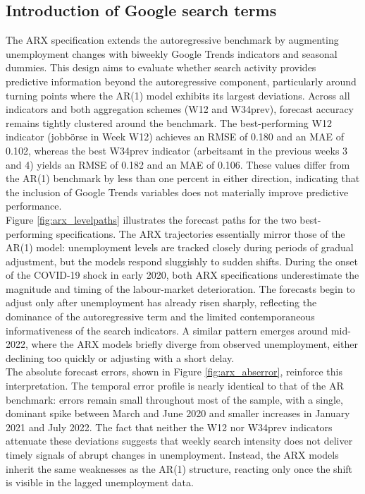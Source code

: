 \documentclass[12pt,a4paper]{article}
\begin{document}
\subsection{Introduction of Google search terms}
The ARX specification extends the autoregressive benchmark by augmenting unemployment changes with biweekly Google Trends indicators and seasonal dummies. This design aims to evaluate whether search activity provides predictive information beyond the autoregressive component, particularly around turning points where the AR(1) model exhibits its largest deviations.
Across all indicators and both aggregation schemes (W12 and W34prev), forecast accuracy remains tightly clustered around the benchmark. The best-performing W12 indicator (jobbörse in Week W12) achieves an RMSE of 0.180 and an MAE of 0.102, whereas the best W34prev indicator (arbeitsamt in the previous weeks 3 and 4) yields an RMSE of 0.182 and an MAE of 0.106. These values differ from the AR(1) benchmark by less than one percent in either direction, indicating that the inclusion of Google Trends variables does not materially improve predictive performance.\\
Figure \ref{fig:arx_levelpaths} illustrates the forecast paths for the two best-performing specifications. The ARX trajectories essentially mirror those of the AR(1) model: unemployment levels are tracked closely during periods of gradual adjustment, but the models respond sluggishly to sudden shifts.
During the onset of the COVID-19 shock in early 2020, both ARX specifications underestimate the magnitude and timing of the labour-market deterioration. The forecasts begin to adjust only after unemployment has already risen sharply, reflecting the dominance of the autoregressive term and the limited contemporaneous informativeness of the search indicators. A similar pattern emerges around mid-2022, where the ARX models briefly diverge from observed unemployment, either declining too quickly or adjusting with a short delay.
\\
The absolute forecast errors, shown in Figure \ref{fig:arx_abserror}, reinforce this interpretation. The temporal error profile is nearly identical to that of the AR benchmark: errors remain small throughout most of the sample, with a single, dominant spike between March and June 2020 and smaller increases in January 2021 and July 2022. The fact that neither the W12 nor W34prev indicators attenuate these deviations suggests that weekly search intensity does not deliver timely signals of abrupt changes in unemployment. Instead, the ARX models inherit the same weaknesses as the AR(1) structure, reacting only once the shift is visible in the lagged unemployment data. \\
\end{document}
